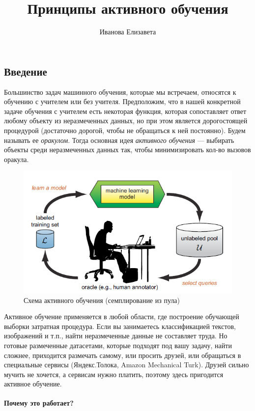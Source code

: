 \documentclass[specialist, 12pt, href]{article}
\title{Принципы активного обучения}
\author{Иванова Елизавета}
\date{}
\begin{document}
\maketitle

\subsection{Введение}

Большинство задач машинного обучения, которые мы встречаем, относятся к
обучению с учителем или без учителя.
Предположим, что в нашей конкретной задаче обучения с учителем есть
некоторая функция, которая сопоставляет ответ любому объекту из
неразмеченных данных, но при этом является дорогостоящей процедурой
(достаточно дорогой, чтобы не обращаться к ней постоянно). Будем
называть ее \emph{оракулом}. Тогда основная идея \emph{активного обучения} ---
выбирать объекты среди неразмеченных данных так, чтобы минимизировать кол-во вызовов
оракула.

\begin{figure}[htbp]
\centering
\includegraphics[width=5in]{img/al.png}
\caption{Схема активного обучения (семплирование из пула)}
\end{figure}

Активное обучение применяется в любой области, где построение обучающей
выборки затратная процедура. Если вы занимаетесь классификацией текстов,
изображений и т.п., найти неразмеченные данные не составляет труда. Но
готовые размеченные датасетами, которые подходят под вашу задачу, найти
сложнее, приходится размечать самому, или просить друзей, или обращаться
в специальные сервисы (Яндекс.Толока, Amazon Mechanical Turk). Друзей
сильно мучить не хочется, а сервисам нужно платить, поэтому здесь
пригодится активное обучение.

\paragraph{Почему это
работает?}
\end{document}

